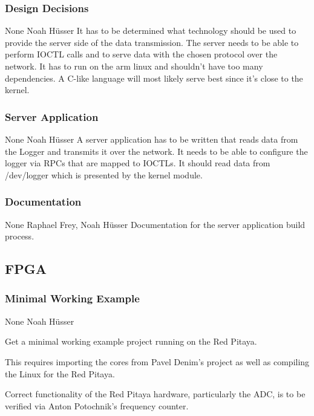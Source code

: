 \documentclass[a4paper,oneside]{alpenspecs/alpenspecs}
\begin{document}
\subsubsection{Design Decisions}
\label{subsubsec:fw:server:design-decisions}
\wpac
     {}
     {}
     {}
     {None}
     {}
     {Noah H\"usser}
     {%
         It has to be determined what technology should be used to provide the server side of the data transmission.
         The server needs to be able to perform IOCTL calls and to serve data with the chosen protocol over the network. It has to run on the arm linux and shouldn't have too many dependencies.
         A C-like language will most likely serve best since it's close to the kernel.
     }

\subsubsection{Server Application}
\label{subsubsec:fw:server:server}
\wpac
     {}
     {}
     {}
     {None}
     {}
     {Noah H\"usser}
     {%
         A server application has to be written that reads data from the Logger and transmits it over the network.
         It needs to be able to configure the logger via RPCs that are mapped to IOCTLs.
         It should read data from /dev/logger which is presented by the kernel module.
     }

\subsubsection{Documentation}
\label{subsubsec:fw:server:docs}
\wpac
     {}
     {}
     {}
     {None}
     {}
     {Raphael Frey, Noah H\"usser}
     {%
         Documentation for the server application build process.
     }

\subsection{FPGA}
\label{subsec:fw:fpga}

\subsubsection{Minimal Working Example}
\label{subsubsec:fw:fpga:mwe}
\wpac
     {}
     {}
     {}
     {None}
     {}
     {Noah H\"usser}
     {%
         Get a minimal working example project running on the Red Pitaya.

         This requires importing the cores from Pavel Denim's project as
         well as compiling the Linux for the Red Pitaya.

         Correct functionality of the Red Pitaya hardware, particularly the
         ADC, is to be verified via Anton Potochnik's frequency counter.
     }
\end{document}
